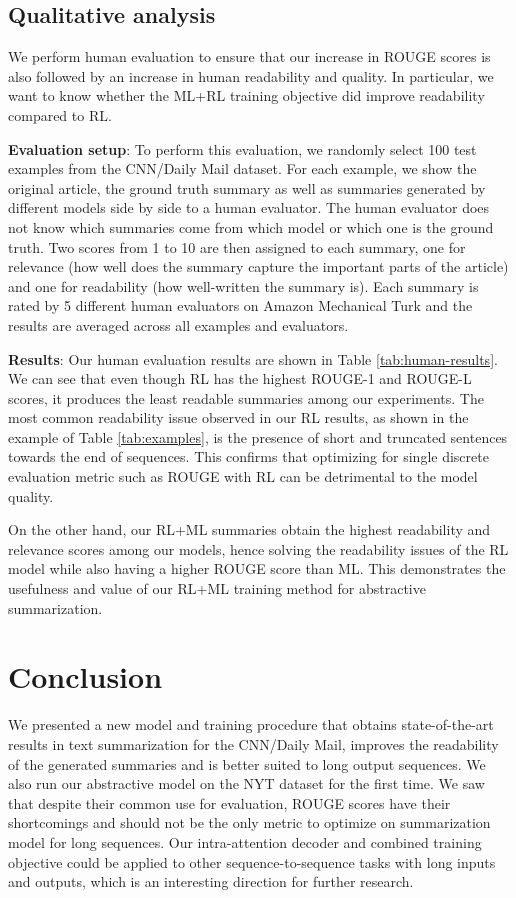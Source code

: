 \subsection{Qualitative analysis}
\label{ssec:qual-analysis}

We perform human evaluation to ensure that our increase in ROUGE scores is also followed by an increase in human readability and quality. In particular, we want to know whether the ML+RL training objective did improve readability compared to RL.

{\bf Evaluation setup}: To perform this evaluation, we randomly select 100 test examples from the CNN/Daily Mail dataset. For each example, we show the original article, the ground truth summary as well as summaries generated by different models side by side to a human evaluator. The human evaluator does not know which summaries come from which model or which one is the ground truth. Two scores from 1 to 10 are then assigned to each summary, one for relevance (how well does the summary capture the important parts of the article) and one for readability (how well-written the summary is). Each summary is rated by 5 different human evaluators on Amazon Mechanical Turk and the results are averaged across all examples and evaluators.

{\bf Results}: Our human evaluation results are shown in Table \ref{tab:human-results}. We can see that even though RL has the highest ROUGE-1 and ROUGE-L scores, it produces the least readable summaries among our experiments. The most common readability issue observed in our RL results, as shown in the example of Table \ref{tab:examples}, is the presence of short and truncated sentences towards the end of sequences. This confirms that optimizing for single discrete evaluation metric such as ROUGE with RL can be detrimental to the model quality.

On the other hand, our RL+ML summaries obtain the highest readability and relevance scores among our models, hence solving the readability issues of the RL model while also having a higher ROUGE score than ML. This demonstrates the usefulness and value of our RL+ML training method for abstractive summarization.

\section{Conclusion}
\label{sec:conclusion}

We presented a new model and training procedure that obtains state-of-the-art results in text summarization for the CNN/Daily Mail, improves the readability of the generated summaries and is better suited to long output sequences. We also run our abstractive model on the NYT dataset for the first time. We saw that despite their common use for evaluation, ROUGE scores have their shortcomings and should not be the only metric to optimize on summarization model for long sequences. Our intra-attention decoder and combined training objective could be applied to other sequence-to-sequence tasks with long inputs and outputs, which is an interesting direction for further research.


